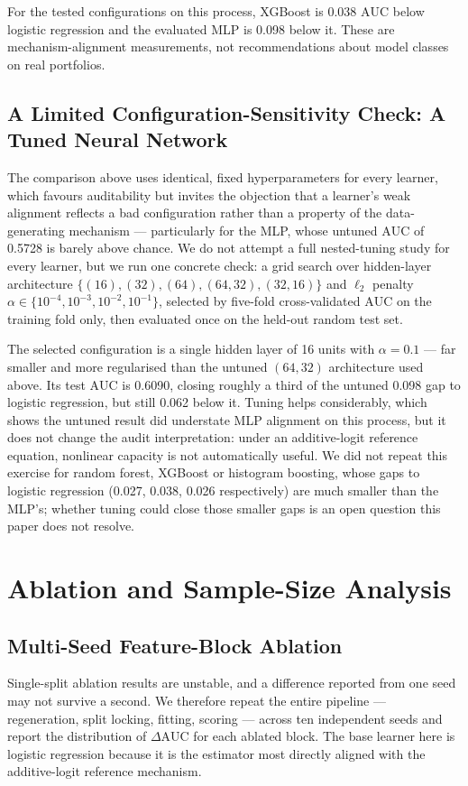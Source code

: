 \documentclass[journal]{IEEEtran}
\newcommand{\auc}{\mbox{AUC}}
\begin{document}
For the tested configurations on this process, XGBoost is 0.038 $\auc$ below logistic regression and the evaluated MLP is 0.098 below it. These are mechanism-alignment measurements, not recommendations about model classes on real portfolios.

\subsection{A Limited Configuration-Sensitivity Check: A Tuned Neural Network}
\label{sec:tuning-check}
The comparison above uses identical, fixed hyperparameters for every learner, which favours auditability but invites the objection that a learner's weak alignment reflects a bad configuration rather than a property of the data-generating mechanism --- particularly for the MLP, whose untuned $\auc$ of 0.5728 is barely above chance. We do not attempt a full nested-tuning study for every learner, but we run one concrete check: a grid search over hidden-layer architecture $\{(16),(32),(64),(64,32),(32,16)\}$ and $\ell_2$ penalty $\alpha\in\{10^{-4},10^{-3},10^{-2},10^{-1}\}$, selected by five-fold cross-validated $\auc$ on the training fold only, then evaluated once on the held-out random test set.

The selected configuration is a single hidden layer of 16 units with $\alpha=0.1$ --- far smaller and more regularised than the untuned $(64,32)$ architecture used above. Its test $\auc$ is 0.6090, closing roughly a third of the untuned 0.098 gap to logistic regression, but still 0.062 below it. Tuning helps considerably, which shows the untuned result did understate MLP alignment on this process, but it does not change the audit interpretation: under an additive-logit reference equation, nonlinear capacity is not automatically useful. We did not repeat this exercise for random forest, XGBoost or histogram boosting, whose gaps to logistic regression (0.027, 0.038, 0.026 respectively) are much smaller than the MLP's; whether tuning could close those smaller gaps is an open question this paper does not resolve.

\section{Ablation and Sample-Size Analysis}
\label{sec:ablation}

\subsection{Multi-Seed Feature-Block Ablation}
Single-split ablation results are unstable, and a difference reported from one seed may not survive a second. We therefore repeat the entire pipeline --- regeneration, split locking, fitting, scoring --- across ten independent seeds and report the distribution of $\Delta\auc$ for each ablated block. The base learner here is logistic regression because it is the estimator most directly aligned with the additive-logit reference mechanism.
\end{document}
